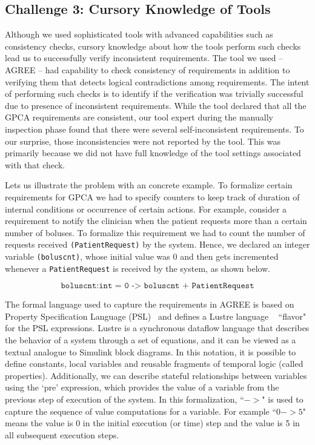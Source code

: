 \subsection{Challenge 3: Cursory Knowledge of Tools}

Although we used sophisticated tools with advanced capabilities such as consistency checks, cursory knowledge about how the tools perform such checks lead us to successfully verify inconsistent requirements. The tool we used -- AGREE -- had capability to check consistency of requirements in addition to verifying them that detects logical contradictions among requirements. The intent of performing such checks is to identify if the verification was trivially successful due to presence of inconsistent requirements. While the tool declared that all the GPCA requirements are consistent, our tool expert during the manually inspection phase found that there were several self-inconsistent requirements. To our surprise, those inconsistencies were not reported by the tool. This was primarily because we did not have full knowledge of the tool settings associated with that check.

Lets us illustrate the problem with an concrete example. To formalize certain requirements for GPCA we had to specify counters to keep track of duration of internal conditions or occurrence of certain actions. For example, consider a requirement to notify the clinician when the patient requests more than a certain number of boluses. To formalize this requirement we had to count the number of requests received \texttt{(PatientRequest)} by the system. Hence, we declared an integer variable \texttt{(boluscnt)}, whose initial value was 0 and then gets incremented whenever a \texttt{PatientRequest} is received by the system, as shown below. 

$$ \texttt{boluscnt:int = 0 -> boluscnt + PatientRequest} $$

The formal language used to capture the requirements in AGREE is based on Property Specification Language (PSL)~\cite{IEEE-PSL} and defines a Lustre language
~\cite{Caspi87:lustre} ``flavor" for the PSL expressions. Lustre is a synchronous dataflow language that describes the behavior of a system through a set of equations, and it can be viewed as a textual analogue to Simulink block diagrams. In this notation, it is possible to define constants, local variables and reusable fragments of temporal logic (called properties). Additionally, we can describe stateful relationships between variables using
the `pre' expression, which provides the value of a variable from the previous step of execution of the system. In this formalization, ``$->$" is used to capture the sequence of value computations for a variable. For example ``$0 -> 5$" means the value is 0 in the initial execution (or time) step and the value is 5 in all subsequent execution steps.

